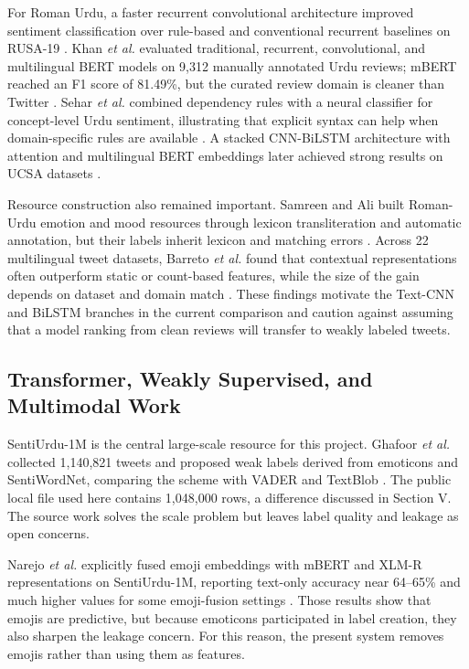\documentclass[conference]{IEEEtran}
\begin{document}
For Roman Urdu, a faster recurrent convolutional architecture improved sentiment classification over rule-based and conventional recurrent baselines on RUSA-19 \cite{nagra2022faster}. Khan \emph{et al.} evaluated traditional, recurrent, convolutional, and multilingual BERT models on 9,312 manually annotated Urdu reviews; mBERT reached an F1 score of 81.49\%, but the curated review domain is cleaner than Twitter \cite{khan2022multiclass}. Sehar \emph{et al.} combined dependency rules with a neural classifier for concept-level Urdu sentiment, illustrating that explicit syntax can help when domain-specific rules are available \cite{sehar2023hybrid}. A stacked CNN-BiLSTM architecture with attention and multilingual BERT embeddings later achieved strong results on UCSA datasets \cite{khan2025empowering}.

Resource construction also remained important. Samreen and Ali built Roman-Urdu emotion and mood resources through lexicon transliteration and automatic annotation, but their labels inherit lexicon and matching errors \cite{samreen2024dataset}. Across 22 multilingual tweet datasets, Barreto \emph{et al.} found that contextual representations often outperform static or count-based features, while the size of the gain depends on dataset and domain match \cite{barreto2023assessment}. These findings motivate the Text-CNN and BiLSTM branches in the current comparison and caution against assuming that a model ranking from clean reviews will transfer to weakly labeled tweets.

\subsection{Transformer, Weakly Supervised, and Multimodal Work}
SentiUrdu-1M is the central large-scale resource for this project. Ghafoor \emph{et al.} collected 1,140,821 tweets and proposed weak labels derived from emoticons and SentiWordNet, comparing the scheme with VADER and TextBlob \cite{ghafoor2023sentiurdu}. The public local file used here contains 1,048,000 rows, a difference discussed in Section V. The source work solves the scale problem but leaves label quality and leakage as open concerns.

Narejo \emph{et al.} explicitly fused emoji embeddings with mBERT and XLM-R representations on SentiUrdu-1M, reporting text-only accuracy near 64--65\% and much higher values for some emoji-fusion settings \cite{narejo2024emoji}. Those results show that emojis are predictive, but because emoticons participated in label creation, they also sharpen the leakage concern. For this reason, the present system removes emojis rather than using them as features.
\end{document}

